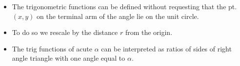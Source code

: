\begin{frame}
\begin{itemize}
\item The trigonometric functions can be defined without requesting that the pt. $(x,y)$ on the terminal arm of the angle lie on the unit circle.
\item<2-> To do so we rescale by the distance $r$ from the origin.
\item The trig functions of acute $\alpha$ can be interpreted as ratios of sides of right angle triangle with one angle equal to $\alpha$.
\end{itemize}

\end{frame}

